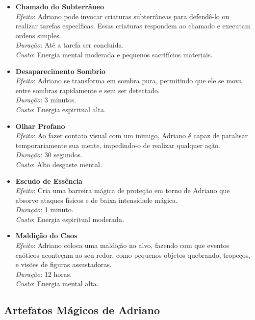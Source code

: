 \begin{itemize}
    \item \textbf{Chamado do Subterrâneo} \\
    \textit{Efeito}: Adriano pode invocar criaturas subterrâneas para defendê-lo ou realizar tarefas específicas. Essas criaturas respondem ao chamado e executam ordens simples. \\
    \textit{Duração}: Até a tarefa ser concluída. \\
    \textit{Custo}: Energia mental moderada e pequenos sacrifícios materiais.

    \item \textbf{Desaparecimento Sombrio} \\
    \textit{Efeito}: Adriano se transforma em sombra pura, permitindo que ele se mova entre sombras rapidamente e sem ser detectado. \\
    \textit{Duração}: 3 minutos. \\
    \textit{Custo}: Energia espiritual alta.

    \item \textbf{Olhar Profano} \\
    \textit{Efeito}: Ao fazer contato visual com um inimigo, Adriano é capaz de paralisar temporariamente sua mente, impedindo-o de realizar qualquer ação. \\
    \textit{Duração}: 30 segundos. \\
    \textit{Custo}: Alto desgaste mental.

    \item \textbf{Escudo de Essência} \\
    \textit{Efeito}: Cria uma barreira mágica de proteção em torno de Adriano que absorve ataques físicos e de baixa intensidade mágica. \\
    \textit{Duração}: 1 minuto. \\
    \textit{Custo}: Energia espiritual moderada.

    \item \textbf{Maldição do Caos} \\
    \textit{Efeito}: Adriano coloca uma maldição no alvo, fazendo com que eventos caóticos aconteçam ao seu redor, como pequenos objetos quebrando, tropeços, e visões de figuras assustadoras. \\
    \textit{Duração}: 12 horas. \\
    \textit{Custo}: Energia mental alta.
\end{itemize}

\subsection{Artefatos Mágicos de Adriano}


